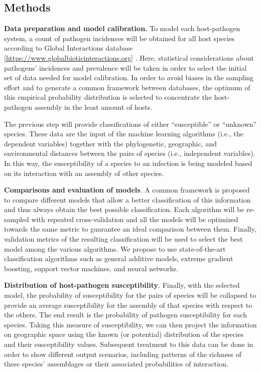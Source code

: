 \documentclass{article}
\begin{document}




\subsection*{Methods}

\textbf{Data preparation and model calibration. } 
To model each host-pathogen system, a count of pathogen incidences will be obtained for all host species according to Global Interactions database [\url{https://www.globalbioticinteractions.org}] \cite{poelen2014global} . Here, statistical considerations about pathogens’ incidences and prevalence will be taken in order to select the initial set of data needed for model calibration. In order to avoid biases in the sampling effort and to generate a common framework between databases, the optimum of this empirical probability distribution is selected to concentrate the host-pathogen assembly in the least amount of hosts.

The previous step will provide classifications of either “susceptible” or “unknown” species. These data are the input of the  machine learning algorithms (i.e., the dependent variables) together with the phylogenetic, geographic, and environmental distances between the pairs of species (i.e., independent variables). In this way, the susceptibility of a species to an infection is being modeled based on its interaction with an assembly of other species.

\textbf{Comparisons and evaluation of models}. A common framework is proposed to compare different models that allow a better classification of this information and thus always obtain the best possible classification. Each algorithm will be re-sampled with repeated cross-validation and all the models will be optimized towards the same metric to guarantee an ideal comparison between them. Finally, validation metrics of the resulting classification will be used to select the best model among the various algorithms. We propose to use state-of-the-art classification algorithms such as general additive models, extreme gradient boosting, support vector machines, and neural networks. 


\textbf{Distribution of host-pathogen susceptibility}. Finally, with the selected model, the probability of susceptibility for the pairs of species will be collapsed to provide an average susceptibility for the assembly of that species with respect to the others. The end result is the probability of pathogen susceptibility for each species. Taking this measure of susceptibility, we can then project the information on geographic space using the known (or potential) distribution of the species and their susceptibility values. Subsequent treatment to this data can be done in order to show different output scenarios, including patterns of the richness of these species’ assemblages or their associated probabilities of interaction.
\end{document}
